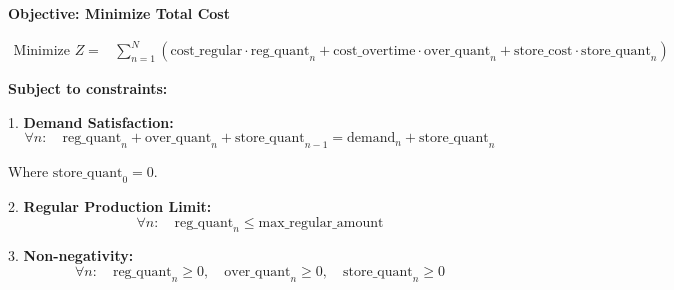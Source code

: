 \documentclass{article}
\begin{document}
\textbf{Objective: Minimize Total Cost}

\[
\begin{align*}
\text{Minimize } Z = & \sum_{n=1}^{N} \left( \text{cost\_regular} \cdot \text{reg\_quant}_n + \text{cost\_overtime} \cdot \text{over\_quant}_n + \text{store\_cost} \cdot \text{store\_quant}_n \right)
\end{align*}
\]

\textbf{Subject to constraints:}

1. \textbf{Demand Satisfaction:}
\[
\forall n: \quad \text{reg\_quant}_n + \text{over\_quant}_n + \text{store\_quant}_{n-1} = \text{demand}_n + \text{store\_quant}_n
\]

Where \(\text{store\_quant}_0 = 0\).

2. \textbf{Regular Production Limit:}
\[
\forall n: \quad \text{reg\_quant}_n \leq \text{max\_regular\_amount}
\]

3. \textbf{Non-negativity:}
\[
\forall n: \quad \text{reg\_quant}_n \geq 0, \quad \text{over\_quant}_n \geq 0, \quad \text{store\_quant}_n \geq 0
\]
\end{document}
